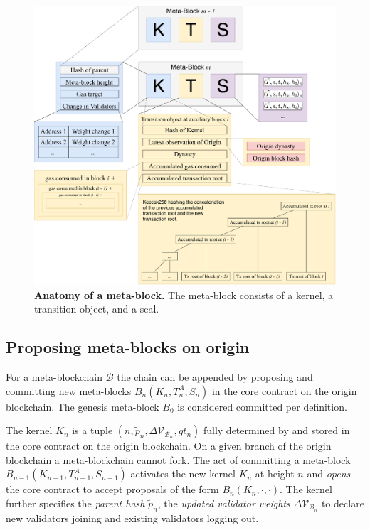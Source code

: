 \documentclass[12pt,a4paper]{article}
\begin{document}
\begin{figure}
    \centering
	\includegraphics[width=\textwidth]{meta_block}
	\caption{\textbf{Anatomy of a meta-block.}
		The meta-block consists of a kernel, a transition object, and a seal.
	}
	\label{fig:meta_block}
\end{figure}

\subsection{Proposing meta-blocks on origin}
\label{proposing_metablocks}

For a meta-blockchain $\mathcal{B}$ the chain can be appended by proposing and committing new meta-blocks $B_n(K_n, T^A_n, S_n)$ in the core contract on the origin block\-chain.
The genesis meta-block $B_0$ is considered committed per definition.

The kernel $K_n$ is a tuple $(n, \tilde{p}_n, \Delta\mathcal{V}_{\mathcal{B}_n}, gt_n)$ fully determined by and stored in the core contract on the origin blockchain. %
On a given branch of the origin blockchain a meta-blockchain cannot fork.
The act of committing a meta-block $B_{n-1}(K_{n-1}, T^A_{n-1}, S_{n-1})$ activates the new kernel $K_n$ at height $n$ and \emph{opens} the core contract to accept proposals of the form $B_n(K_n, \cdot, \cdot)$.
The kernel further specifies the \emph{parent hash} $\tilde{p}_n$, the \emph{updated validator weights} $\Delta\mathcal{V}_{\mathcal{B}_n}$ to declare new validators joining and existing validators logging out.
\end{document}
